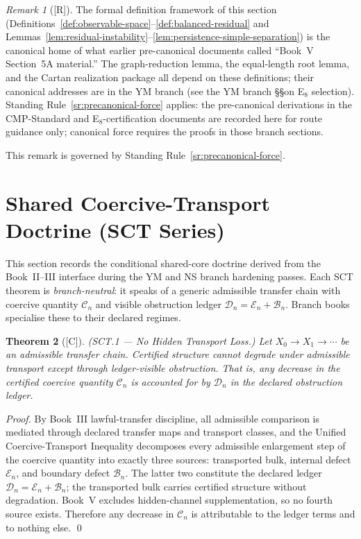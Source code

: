\documentclass[12pt,oneside]{amsbook}
\theoremstyle{plain}
\newtheorem{theorem}{Theorem}[section]
\theoremstyle{definition}
\theoremstyle{remark}
\newtheorem{remark}[theorem]{Remark}
\newcommand{\status}[1]{\textup{[#1]}}
\begin{document}
\begin{remark}[\status{R}]\label{rem:book-v-5a-precanon}
The formal definition framework of this section
(Definitions~\ref{def:observable-space}--\ref{def:balanced-residual}
and Lemmas~\ref{lem:residual-instability}--\ref{lem:persistence-simple-separation})
is the canonical home of what earlier pre-canonical documents called
``Book~V Section~5A material.''  The graph-reduction lemma, the
equal-length root lemma, and the Cartan realization package all depend
on these definitions; their canonical addresses are in the YM branch
(see the YM branch \S\S on E${}_8$ selection).
Standing Rule~\ref{sr:precanonical-force} applies: the pre-canonical
derivations in the CMP-Standard and E${}_8$-certification documents
are recorded here for route guidance only; canonical force requires
the proofs in those branch sections.

This remark is governed by
Standing Rule~\ref{sr:precanonical-force}.
\end{remark}

\section{Shared Coercive-Transport Doctrine (SCT Series)}
\label{sec:sct-doctrine}

This section records the conditional shared-core doctrine derived
from the Book~II--III interface during the YM and NS branch hardening
passes.  Each SCT theorem is \emph{branch-neutral}: it speaks of a
generic admissible transfer chain with coercive quantity
$\mathcal{C}_n$ and visible obstruction ledger
$\mathcal{D}_n = \mathcal{E}_n + \mathcal{B}_n$.  Branch books
specialise these to their declared regimes.

\begin{theorem}[\status{C}]\label{thm:SCT1}
\textup{(SCT.1 --- No Hidden Transport Loss.)}
Let $X_0 \to X_1 \to \cdots$ be an admissible transfer chain.
Certified structure cannot degrade under admissible transport except
through ledger-visible obstruction.  That is, any decrease in the
certified coercive quantity $\mathcal{C}_n$ is accounted for by
$\mathcal{D}_n$ in the declared obstruction ledger.
\end{theorem}

\begin{proof}
By Book~III lawful-transfer discipline, all admissible comparison is
mediated through declared transfer maps and transport classes, and
the Unified Coercive-Transport Inequality decomposes every admissible
enlargement step of the coercive quantity into exactly three sources:
transported bulk, internal defect $\mathcal{E}_n$, and boundary
defect $\mathcal{B}_n$.  The latter two constitute the declared
ledger $\mathcal{D}_n = \mathcal{E}_n + \mathcal{B}_n$; the
transported bulk carries certified structure without degradation.
Book~V excludes hidden-channel supplementation, so no fourth source
exists.  Therefore any decrease in $\mathcal{C}_n$ is attributable
to the ledger terms and to nothing else. \qed
\end{proof}
\end{document}
